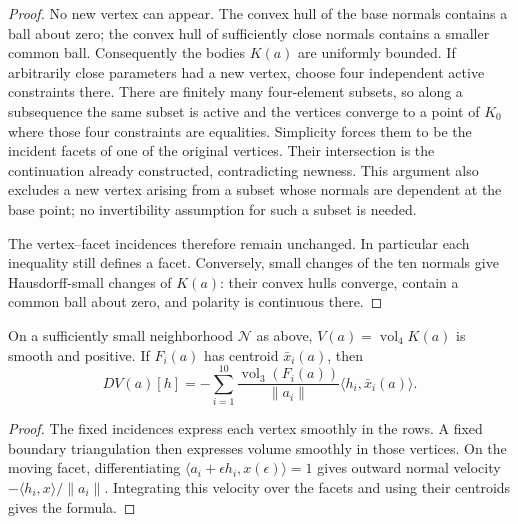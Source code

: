 \begin{proof}
No new vertex can appear. The convex hull of the base normals contains a
ball about zero; the convex hull of sufficiently close normals contains a
smaller common ball. Consequently the bodies $K(a)$ are uniformly bounded.
If arbitrarily close parameters had a new vertex, choose four independent
active constraints there. There are finitely many four-element subsets,
so along a subsequence the same subset is active and the vertices converge
to a point of $K_0$ where those four constraints are equalities. Simplicity
forces them to be the incident facets of one of the original vertices.
Their intersection is the continuation already constructed, contradicting
newness. This argument also excludes a new vertex arising from a subset
whose normals are dependent at the base point; no invertibility assumption
for such a subset is needed.

The vertex--facet incidences therefore remain unchanged. In particular
each inequality still defines a facet. Conversely,
small changes of the ten normals give Hausdorff-small changes of $K(a)$:
their convex hulls converge, contain a common ball about zero, and polarity
is continuous there.

\end{proof}

\begin{lemma}\label{lem:hko-smooth-volume}
On a sufficiently small neighborhood $\mathcal N$ as above, $V(a)=
\operatorname{vol}_4K(a)$ is smooth and positive. If $F_i(a)$ has centroid
$\bar x_i(a)$, then
\[
 DV(a)[h]=-\sum_{i=1}^{10}
 \frac{\operatorname{vol}_3(F_i(a))}{\|a_i\|}
 \langle h_i,\bar x_i(a)\rangle.
\]
\end{lemma}
\begin{proof}
The fixed incidences express each vertex smoothly in the rows. A fixed
boundary triangulation then expresses volume smoothly in those vertices.
On the moving facet, differentiating
$\langle a_i+\epsilon h_i,x(\epsilon)\rangle=1$ gives outward normal
velocity $-\langle h_i,x\rangle/\|a_i\|$. Integrating this velocity over
the facets and using their centroids gives the formula.
\end{proof}

